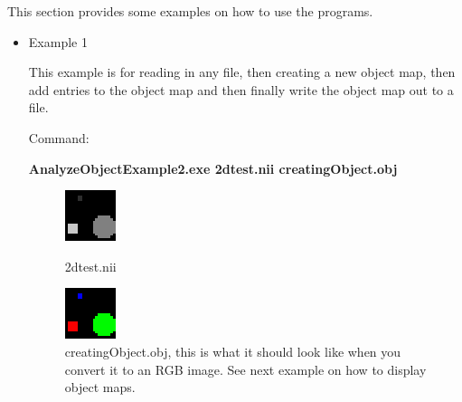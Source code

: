 \documentclass{InsightArticle}
\begin{document}
This section provides some examples on how to use the programs.
\begin{itemize}
\item Example 1 

This example is for reading in any file, then creating a new object map,
then add entries to the object map and then finally write the object map out to a file.

Command:

\textbf{AnalyzeObjectExample2.exe 2dtest.nii creatingObject.obj}


\begin{figure}[h]
  \hfill
  \begin{minipage}[t]{.45\textwidth}
    \begin{center}  
      \includegraphics[width=.5\textwidth]{2dtest.eps}
      \caption{2dtest.nii}
      \label{fig-tc}
    \end{center}
  \end{minipage}
  \hfill
  \begin{minipage}[t]{.45\textwidth}
    \begin{center}  
      \includegraphics[width=.5\textwidth]{creatingObject.eps}
      \caption{creatingObject.obj, this is what it should look like when you convert it to an RGB image.  See next example on how to display 
    object maps.}
      \label{fig-tc}
    \end{center}
  \end{minipage}
  \hfill
\end{figure}
  


\end{itemize}
\end{document}
